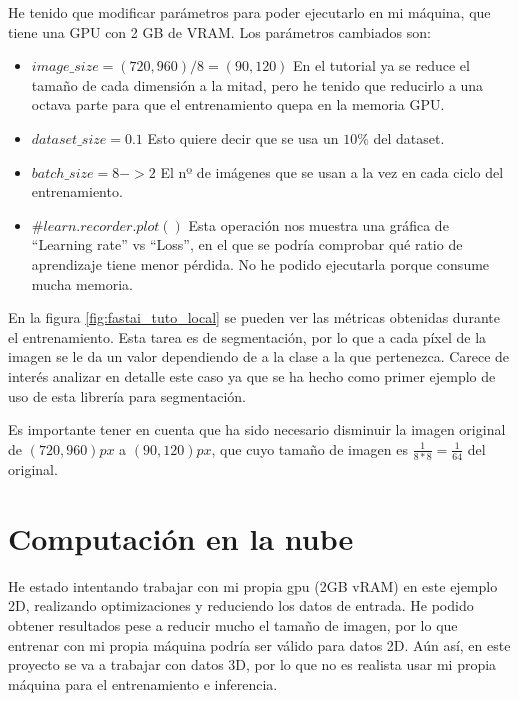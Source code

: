 He tenido que modificar parámetros para poder ejecutarlo en mi máquina, que tiene una GPU con 2 GB de VRAM. Los parámetros cambiados son:
\begin{itemize}
\item $image\_size = (720, 960) / 8 = (90, 120)$ En el tutorial ya se reduce el tamaño de cada dimensión a la mitad, pero he tenido que reducirlo a una octava parte para que el entrenamiento quepa en la memoria GPU.
\item $dataset\_size = 0.1$ Esto quiere decir que se usa un $10\%$ del dataset.
\item $batch\_size = 8 -> 2$ El nº de imágenes que se usan a la vez en cada ciclo del entrenamiento.
\item $\#learn.recorder.plot()$ Esta operación nos muestra una gráfica de “Learning rate” vs “Loss”, en el que se podría comprobar qué ratio de aprendizaje tiene menor pérdida. No he podido ejecutarla porque consume mucha memoria.
\end{itemize}


En la figura \ref{fig:fastai_tuto_local} se pueden ver las métricas obtenidas durante el entrenamiento. Esta tarea es de segmentación, por lo que a cada píxel de la imagen se le da un valor dependiendo de a la clase a la que pertenezca. Carece de interés analizar en detalle este caso ya que se ha hecho como primer ejemplo de uso de esta librería para segmentación.

Es importante tener en cuenta que ha sido necesario disminuir la imagen original de $(720, 960)px$ a $(90, 120)px$, que cuyo tamaño de imagen es $\frac{1}{8*8}=\frac{1}{64}$ del original.

\section{Computación en la nube}\label{sec:cloud_dev}

He estado intentando trabajar con mi propia gpu (2GB vRAM) en este ejemplo 2D, realizando optimizaciones y reduciendo los datos de entrada. He podido obtener resultados pese a reducir mucho el tamaño de imagen, por lo que entrenar con mi propia máquina podría ser válido para datos 2D. Aún así, en este proyecto se va a trabajar con datos 3D, por lo que no es realista usar mi propia máquina para el entrenamiento e inferencia.

